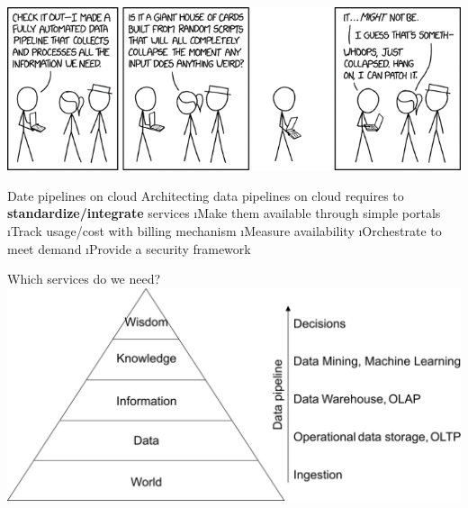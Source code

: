 
\begin{frame}{}
\includegraphics[width=\linewidth]{imgs/xkcd_pipeline.png}    
\end{frame}

\begin{frame}{Date pipelines on cloud}
Architecting data pipelines on cloud requires to \textbf{standardize/integrate} services
\i Make them available through simple portals
\i Track usage/cost with billing mechanism
\i Measure availability
\i Orchestrate to meet demand
\i Provide a security framework
\end{frame}

\begin{frame}{Which services do we need?}
\includegraphics[height=.7\textheight]{imgs/knowledgepyramid.pdf}
\end{frame}

